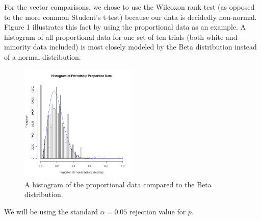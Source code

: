 For the vector comparisons, we chose to use the Wilcoxon rank test (as opposed to the more common Student's t-test) because our data is decidedly non-normal. Figure 1 illustrates this 
fact by using the proportional data as an example. A histogram of all proportional data for one set of ten trials (both white and minority data included) is most closely modeled by the Beta distribution instead of a normal distribution.
\begin{figure}[h]
  \centering
    \includegraphics[width=0.5\textwidth]{histogramProportionData.png}
      \caption{A histogram of the proportional data compared to the Beta distribution.}
\end{figure}
We will be using the standard $\alpha=0.05$ rejection value for $p$.

